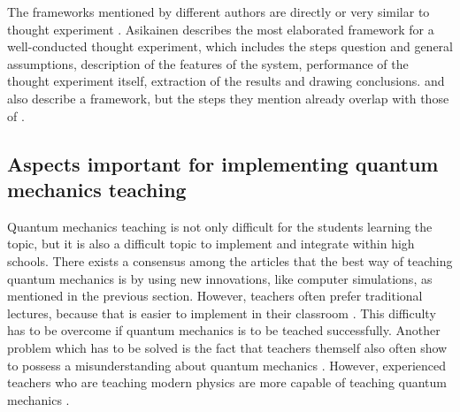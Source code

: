 \documentclass[11pt,twoside]{report} %
\begin{document}
The frameworks mentioned by different authors are directly or very similar to thought experiment \cite{erduran,levrini,asikainen,velentzas}. Asikainen describes the most elaborated framework for a well-conducted thought experiment, which includes the steps question and general assumptions, description of the features of the system, performance of the thought experiment itself, extraction of the results and drawing conclusions.  and  also describe a framework, but the steps they mention already overlap with those of .

\subsection{Aspects important for implementing quantum mechanics teaching}

Quantum mechanics teaching is not only difficult for the students learning the topic, but it is also a difficult topic to implement and integrate within high schools. There exists a consensus among the articles that the best way of teaching quantum mechanics is by using new innovations, like computer simulations, as mentioned in the previous section. However, teachers often prefer traditional lectures, because that is easier to implement in their classroom \cite{adegoke}. This difficulty has to be overcome if quantum mechanics is to be teached successfully. Another problem which has to be solved is the fact that teachers themself also often show to possess a misunderstanding about quantum mechanics \cite{asikainen}. However, experienced teachers who are teaching modern physics are more capable of teaching quantum mechanics \cite{asikainen}.



\end{document}
